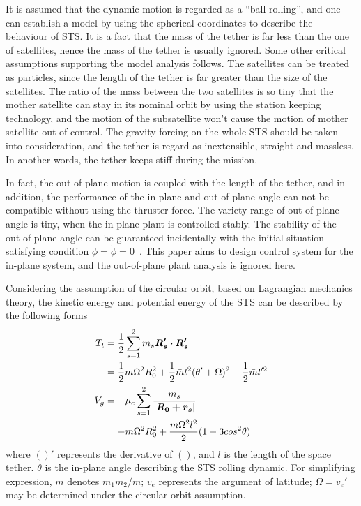 \documentclass[conference]{IEEEtran}
\theoremstyle{plain}
\begin{document}
It is assumed that the dynamic motion is regarded as a ``ball rolling'', and one can establish a model by using the spherical coordinates to describe the behaviour of STS. It is a fact that the mass of the tether is far less than the one of satellites, hence the mass of the tether is usually ignored. Some other critical assumptions supporting the model analysis follows. The satellites can be treated as particles, since the length of the tether is far greater than the size of the satellites. The ratio of the mass between the two satellites is so tiny that the mother satellite can stay in its nominal orbit by using the station keeping technology, and the motion of the subsatellite won't cause the motion of mother satellite out of control. The gravity forcing on the whole STS should be taken into consideration, and the tether is regard as inextensible, straight and massless. In another words, the tether keeps stiff during the mission.\par
In fact, the out-of-plane motion is coupled with the length of the tether, and in addition, the performance of the in-plane and out-of-plane angle can not be compatible without using the thruster force. The variety range of out-of-plane angle is tiny, when the in-plane plant is controlled stably. The stability of the out-of-plane angle can be guaranteed incidentally with the initial situation satisfying condition $\phi=\dot\phi=0$~\cite{Vadali1991Feedback}.  This paper aims to design control system for the in-plane system, and the out-of-plane plant analysis is ignored here.\par
Considering the assumption of the circular orbit, based on Lagrangian mechanics theory, the kinetic energy and potential energy of the STS can be described by the following forms
\begin{align}
T_t
&= \frac{1}{2}\sum\limits_{s=1}^2 m_s\bm{R_s'\cdot R_s'}\notag\\
&= \frac{1}{2}m\Omega^2R_0^2+\frac{1}{2}\bar{m}l^2(\theta'+\Omega)^2+\frac{1}{2}\bar{m}l'^2\label{eq:Tt1}\\
V_g
&= -\mu_e\sum\limits_{s=1}^2\frac{m_s}{\vert \bm{R_0+r_s}\vert}\notag\\
&= -m\Omega^2R_0^2+\frac{\bar{m}\Omega^2l^2}{2}(1-3cos{^2\theta})\label{eq:Vg}
\end{align}
where $()'$ represents the derivative of $()$, and $l$ is the length of the space tether. $\theta$ is the in-plane angle describing the STS rolling dynamic. For simplifying expression, $\bar{m}$ denotes $m_1m_2/m$; $v_e$ represents the argument of latitude; $\Omega = v_e'$ may be determined under the circular orbit assumption.\par
\end{document}
